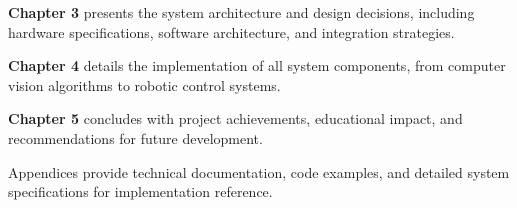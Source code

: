 \textbf{Chapter 3} presents the system architecture and design decisions, including hardware specifications, software architecture, and integration strategies.

\textbf{Chapter 4} details the implementation of all system components, from computer vision algorithms to robotic control systems.

\textbf{Chapter 5} concludes with project achievements, educational impact, and recommendations for future development.

Appendices provide technical documentation, code examples, and detailed system specifications for implementation reference.